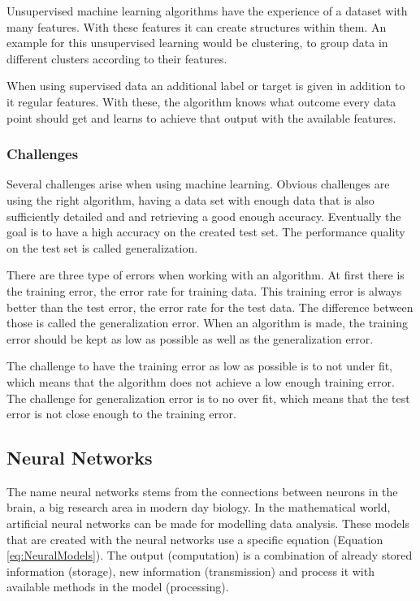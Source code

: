 \documentclass[10pt,a4paper]{article}
\begin{document}
	Unsupervised machine learning algorithms have the experience of a dataset 
	with many features. With these features it can create structures within 
	them. An example for this unsupervised learning would be clustering, to 
	group data in different clusters according to their 
	features.\cite{Goodfellow-et-al-2016}
	
	When using supervised data an additional label or target is given in 
	addition to it regular features. With these, the algorithm knows what 
	outcome every data point should get and learns to achieve that output with 
	the available features. \cite{Goodfellow-et-al-2016}
	
	\subsubsection{Challenges}
	
	Several challenges arise when using machine learning. Obvious challenges 
	are using the right algorithm, having a data set with enough data that is 
	also sufficiently detailed and and retrieving a good enough accuracy. 
	Eventually the goal is to have a high accuracy on the created test set. The 
	performance quality on the test set is called 
	generalization.\cite{Goodfellow-et-al-2016}
	
	
	There are three type of errors when working with an algorithm. At first 
	there is the training error, the error rate for training data. This 
	training error is always better than the test error, the error rate for the 
	test data. The difference between those is called the generalization error. 
	When an algorithm is made, the training error should be kept as low as 
	possible as well as the generalization error.\cite{Goodfellow-et-al-2016}
	
	
	The challenge to have the training error as low as possible is to not under 
	fit, which means that the algorithm does not achieve a low enough training 
	error. The challenge for generalization error is to no over fit, which 
	means that the test error is not close enough to the training 
	error.\cite{Goodfellow-et-al-2016}
	
	\clearpage
	
	\subsection{Neural Networks}
	
	The name neural networks stems from the connections between neurons in the 
	brain, a big research area in modern day biology. In the mathematical 
	world, artificial neural networks can be made for modelling data analysis. 
	These models that are created with the neural networks use a specific 
	equation (Equation \ref{eq:NeuralModels}). The output (computation) is a 
	combination of already stored information (storage), new information 
	(transmission) and process it with available methods in the model 
	(processing).\cite{rojas2013neural}
	
\end{document}
